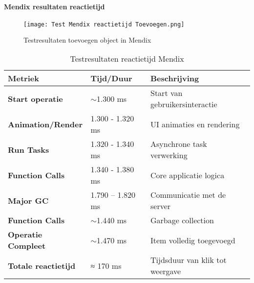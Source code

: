 \newpage




\paragraph{Mendix resultaten reactietijd}

\begin{figure}[H]
    \centering
    \texttt{[image: Test Mendix reactietijd Toevoegen.png]}
    \caption[Testresultaten toevoegen object in Mendix]{\label{fig:reactietijd-Mendix} Testresultaten toevoegen object in Mendix}
\end{figure}


\begin{table}[h]
    \centering
    \begin{tabular}{ |p{5cm}|p{3cm}|p{6cm}|}
        \hline
        \textbf{Metriek} & \textbf{Tijd/Duur} & \textbf{Beschrijving}\\
        \hline
        \textbf{Start operatie}  & $\sim$1.300 ms & Start van gebruikersinteractie \\
        \hline
        \textbf{Animation/Render} & 1.300 - 1.320 ms & \gls{UI} animaties en rendering \\
        \hline
        \textbf{Run Tasks}  & 1.320 - 1.340 ms & Asynchrone task verwerking \\
        \hline
        \textbf{Function Calls}  & 1.340 - 1.380 ms & Core applicatie logica \\
        \hline                       
        \textbf{Major \gls{GC}}  & 1.790 – 1.820 ms & Communicatie met de server  \\
        \hline
        \textbf{Function Calls}  & 	$\sim$1.440 ms & Garbage collection \\
        \hline
        \textbf{Operatie Compleet}  & $\sim$1.470 ms & 	Item volledig toegevoegd \\
        \hline
        \textbf{Totale reactietijd}  & ≈ 170 ms & Tijdsduur van klik tot weergave \\
        \hline
    \end{tabular}
    \caption[\centering Testresultaten reactietijd Mendix]{\label{tab:Testresultaten Mendix reactietijd}Testresultaten reactietijd Mendix}
\end{table}

